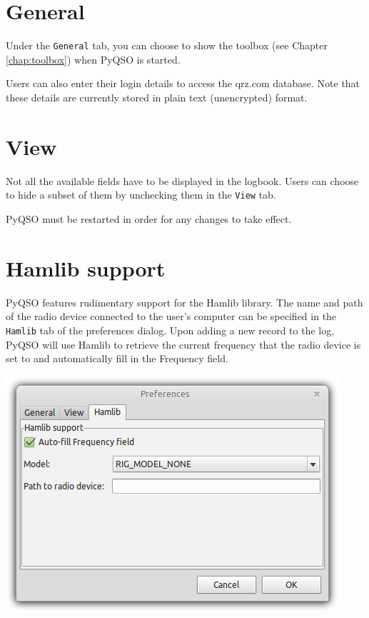 \documentclass[11pt, a4paper]{report}
\begin{document}
\section{General}
Under the \texttt{General} tab, you can choose to show the toolbox (see Chapter \ref{chap:toolbox}) when PyQSO is started.

Users can also enter their login details to access the qrz.com database. Note that these details are currently stored in plain text (unencrypted) format.

\section{View}
Not all the available fields have to be displayed in the logbook. Users can choose to hide a subset of them by unchecking them in the \texttt{View} tab. 

PyQSO must be restarted in order for any changes to take effect.

\section{Hamlib support}
PyQSO features rudimentary support for the Hamlib library. The name and path of the radio device connected to the user's computer can be specified in the \texttt{Hamlib} tab of the preferences dialog. Upon adding a new record to the log, PyQSO will use Hamlib to retrieve the current frequency that the radio device is set to and automatically fill in the Frequency field. 

\begin{center}
  \includegraphics[width=1\columnwidth]{images/preferences_hamlib.png}
\end{center}


\end{document}
